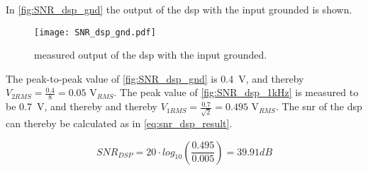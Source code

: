 In \autoref{fig:SNR_dsp_gnd} the output of the \gls{dsp} with the input grounded is shown.

\begin{figure}[H]
  \centering
  \texttt{[image: SNR\_dsp\_gnd.pdf]}
  \caption{measured output of the \gls{dsp} with the input grounded.}
  \label{fig:SNR_dsp_gnd}
\end{figure}

The peak-to-peak value of \autoref{fig:SNR_dsp_gnd} is \SI{0.4}{\volt}, and thereby $V_{2RMS} = \frac{0.4}{8} = 0.05$ V$_{RMS}$.
The peak value of \autoref{fig:SNR_dsp_1kHz} is measured to be \SI{0.7}{\volt}, and thereby and thereby $V_{1RMS} = \frac{0.7}{\sqrt{2}} = 0.495$ V$_{RMS}$. The \gls{snr} of the \gls{dsp} can thereby be calculated as in \autoref{eq:snr_dsp_result}.

\begin{equation}\label{eq:snr_dsp_result}
	SNR_{DSP} = 20 \cdot log_{10}\left(\frac{0.495}{0.005}\right) = 39.91dB
	\end{equation}


